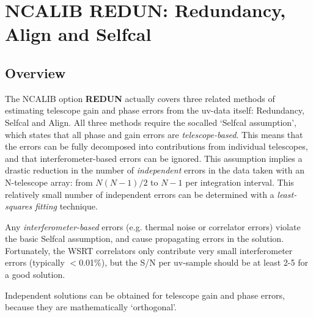 
\newcommand{\be}{\begin{enumerate}} 
\newcommand{\ee}{\end{enumerate}} 
\newcommand{\I}{\item} 


\chapter{NCALIB REDUN: Redundancy, Align and Selfcal} %
\tableofcontents %
\section{Overview}  

        The NCALIB option {\bf REDUN} actually covers three related methods of
estimating telescope gain and phase errors from the uv-data itself: Redundancy,
Selfcal and Align. All three methods require the socalled `Selfcal assumption',
which states that all phase and gain errors are {\em telescope-based}.   
 This means that the errors can be fully decomposed into contributions from
individual telescopes, and that interferometer-based errors can be ignored.
This assumption implies a drastic reduction in the number of {\em independent}
errors in the data taken with an N-telescope array: from $N(N-1)/2$ to $N-1$
per integration interval.  This relatively small number of independent errors
can be determined with a {\em least-squares fitting} technique.  

        Any {\em interferometer-based} errors (e.g.  thermal noise or
correlator errors) violate the basic Selfcal assumption, and cause propagating
errors in the solution.  Fortunately, the WSRT correlators only contribute very
small interferometer errors (typically $<$0.01\%),  
but the S/N per uv-sample should be at least 2-5 for a good solution.  

        Independent solutions can be obtained for telescope gain and phase
errors, because they are mathematically `orthogonal'.  

